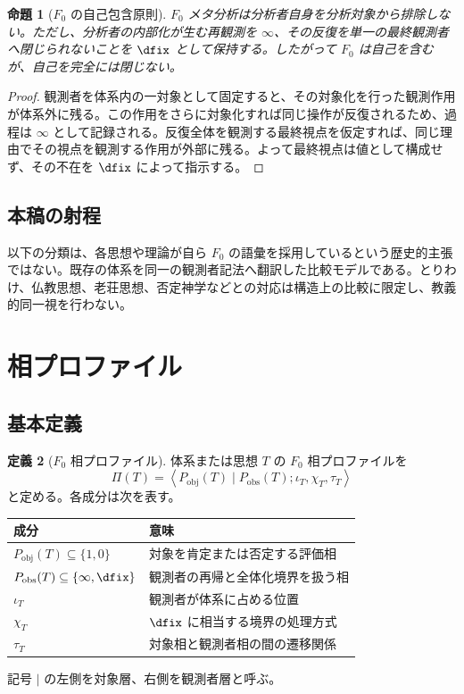 \documentclass[a4paper,11pt]{ltjsarticle}
\theoremstyle{definition}
\newtheorem{definition}{定義}[section]
\theoremstyle{plain}
\newtheorem{proposition}[definition]{命題}
\newcommand{\Phase}{\Pi}
\newcommand{\Pobj}{P_{\mathrm{obj}}}
\newcommand{\Pobs}{P_{\mathrm{obs}}}
\begin{document}
\begin{proposition}[$F_0$ の自己包含原則]
$F_0$ メタ分析は分析者自身を分析対象から排除しない。ただし、分析者の内部化が生む再観測を $\infty$、その反復を単一の最終観測者へ閉じられないことを $\dfix$ として保持する。したがって $F_0$ は自己を含むが、自己を完全には閉じない。
\end{proposition}

\begin{proof}
観測者を体系内の一対象として固定すると、その対象化を行った観測作用が体系外に残る。この作用をさらに対象化すれば同じ操作が反復されるため、過程は $\infty$ として記録される。反復全体を観測する最終視点を仮定すれば、同じ理由でその視点を観測する作用が外部に残る。よって最終視点は値として構成せず、その不在を $\dfix$ によって指示する。
\end{proof}

\subsection{本稿の射程}

以下の分類は、各思想や理論が自ら $F_0$ の語彙を採用しているという歴史的主張ではない。既存の体系を同一の観測者記法へ翻訳した比較モデルである。とりわけ、仏教思想、老荘思想、否定神学などとの対応は構造上の比較に限定し、教義的同一視を行わない。

\section{相プロファイル}

\subsection{基本定義}

\begin{definition}[$F_0$ 相プロファイル]
体系または思想 $T$ の $F_0$ 相プロファイルを
\[
 \Phase(T)
 =
 \left\langle
 \Pobj(T)\mid\Pobs(T);
 \iota_T,\chi_T,\tau_T
 \right\rangle
\]
と定める。各成分は次を表す。
\begin{center}
\begin{tabular}{>{\raggedright\arraybackslash}p{} p{}}
\toprule
成分 & 意味 \\
\midrule
$\Pobj(T)\subseteq\{1,0\}$ & 対象を肯定または否定する評価相 \\
$\Pobs(T)\subseteq\{\infty,\dfix\}$ & 観測者の再帰と全体化境界を扱う相 \\
$\iota_T$ & 観測者が体系に占める位置 \\
$\chi_T$ & $\dfix$ に相当する境界の処理方式 \\
$\tau_T$ & 対象相と観測者相の間の遷移関係 \\
\bottomrule
\end{tabular}
\end{center}
記号 $\mid$ の左側を対象層、右側を観測者層と呼ぶ。
\end{definition}
\end{document}
